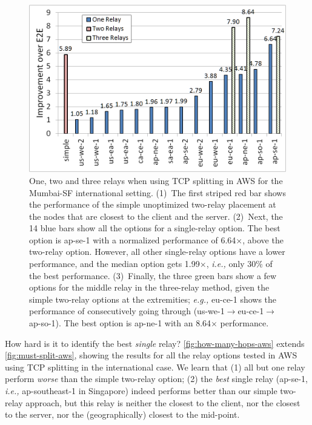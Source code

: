 \documentclass{hotnets17}
\providecommand{\ie}{\emph{i.e.,} }
\providecommand{\eg}{\emph{e.g.,} }
\begin{document}
\begin{figure}
  \centering
    \includegraphics[width=\columnwidth,trim=2mm 2mm 2mm 2mm,clip]{figures/hops.png}
    \caption{One, two and three relays when using  TCP splitting in AWS for the Mumbai-SF international setting. (1)~The first striped red bar shows the performance of the simple unoptimized two-relay placement at the nodes that are closest to the client and the server. (2)~Next, the 14 blue bars show all the options for a single-relay option. The best option is ap-se-1 with a normalized performance of 6.64$\times$, above the two-relay option. However, all other single-relay options have a lower performance, and the    median option gets 1.99$\times$, \ie only 30\% of the best performance. (3)~Finally, the three green bars show a few options for the middle relay in the three-relay method, given the simple two-relay options at the extremities; \eg eu-ce-1 shows the performance of consecutively going through (us-we-1$\to$eu-ce-1$\to$ap-so-1). The best option is ap-ne-1 with an 8.64$\times$ performance.} 
    \label{fig:how-many-hops-aws}
\end{figure}

How hard is it to identify the best \emph{single} relay? \autoref{fig:how-many-hops-aws}
extends \autoref{fig:must-split-aws}, showing the results for all the relay options tested in AWS using TCP splitting in the international case. 
We learn that (1) all but one relay perform \emph{worse} than the simple two-relay option; (2) the \emph{best} single relay (ap-se-1, \ie ap-southeast-1 in Singapore) indeed performs better than our simple two-relay approach, but this relay is neither the closest to the client, nor the closest to the server, nor the (geographically) closest to the mid-point. 
\end{document}

